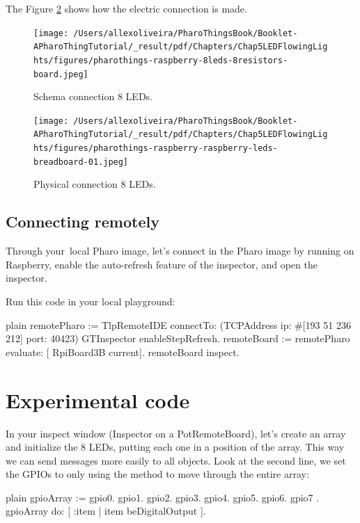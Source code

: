 \documentclass[10pt,twoside,english]{_support/latex/sbabook/sbabook}
\begin{document}
The Figure \ref{Physical8Leds} shows how the electric connection is made.


\begin{figure}

\begin{center}
\texttt{[image: /Users/allexoliveira/PharoThingsBook/Booklet-APharoThingTutorial/\_result/pdf/Chapters/Chap5LEDFlowingLights/figures/pharothings-raspberry-8leds-8resistors-board.jpeg]}\caption{Schema connection 8 LEDs.\label{Schema8Leds}}\end{center}
\end{figure}


\begin{figure}

\begin{center}
\texttt{[image: /Users/allexoliveira/PharoThingsBook/Booklet-APharoThingTutorial/\_result/pdf/Chapters/Chap5LEDFlowingLights/figures/pharothings-raspberry-raspberry-leds-breadboard-01.jpeg]}\caption{Physical connection 8 LEDs.\label{Physical8Leds}}\end{center}
\end{figure}

\subsection{Connecting remotely}
Through your local Pharo image, let's connect in the Pharo image by running on Raspberry, enable the auto-refresh feature of the inspector, and open the inspector.

Run this code in your local playground:

\begin{displaycode}{plain}
remotePharo := TlpRemoteIDE connectTo: (TCPAddress ip: #[193 51 236 212] port: 40423)
GTInspector enableStepRefresh.
remoteBoard := remotePharo evaluate: [ RpiBoard3B current].
remoteBoard inspect.
\end{displaycode}
\section{Experimental code}
In your inspect window (Inspector on a PotRemoteBoard), let’s create an array and initialize the 8 LEDs, putting each one in a position of the array.  This way we can send messages more easily to all objects. Look at the second line, we set the GPIOs to  only using the method  to move through the entire array:

\begin{displaycode}{plain}
gpioArray := { gpio0. gpio1. gpio2. gpio3. gpio4. gpio5. gpio6. gpio7 }.
gpioArray do: [ :item | item beDigitalOutput ].
\end{displaycode}
\end{document}
